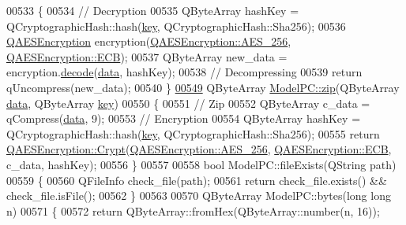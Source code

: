 \begin{DoxyCode}
00533 \{
00534     \textcolor{comment}{// Decryption}
00535     QByteArray hashKey = QCryptographicHash::hash(\mbox{\hyperlink{namespace_errors_dict_setup_a09c268098d09ffb8e5504f30fa6d5dd9}{key}}, QCryptographicHash::Sha256);
00536     \mbox{\hyperlink{class_q_a_e_s_encryption}{QAESEncryption}} encryption(\mbox{\hyperlink{class_q_a_e_s_encryption_abe48208f4f6c7d68e6a10b49b9d0b7bdacde97774ab1d4c609e04b0dd13a1e1f7}{QAESEncryption::AES\_256}}, 
      \mbox{\hyperlink{class_q_a_e_s_encryption_ad3e031c49a3d56566379d75b40b7b255a4ca7f51778e2adf1f464164a0ba8e75e}{QAESEncryption::ECB}});
00537     QByteArray new\_data = encryption.\mbox{\hyperlink{class_q_a_e_s_encryption_a58f972f2b66c2454edd5112495463bba}{decode}}(\mbox{\hyperlink{namespace_errors_dict_setup_af570460846fb9f0c91abd308a095dcdc}{data}}, hashKey);
00538     \textcolor{comment}{// Decompressing}
00539     \textcolor{keywordflow}{return} qUncompress(new\_data);
00540 \}
\mbox{\hyperlink{class_model_p_c_afebbbfa4b07deba4f68fc6dfb50f353f}{00549}} QByteArray \mbox{\hyperlink{class_model_p_c_afebbbfa4b07deba4f68fc6dfb50f353f}{ModelPC::zip}}(QByteArray \mbox{\hyperlink{namespace_errors_dict_setup_af570460846fb9f0c91abd308a095dcdc}{data}}, QByteArray \mbox{\hyperlink{namespace_errors_dict_setup_a09c268098d09ffb8e5504f30fa6d5dd9}{key}})
00550 \{
00551     \textcolor{comment}{// Zip}
00552     QByteArray c\_data = qCompress(\mbox{\hyperlink{namespace_errors_dict_setup_af570460846fb9f0c91abd308a095dcdc}{data}}, 9);
00553     \textcolor{comment}{// Encryption}
00554     QByteArray hashKey = QCryptographicHash::hash(\mbox{\hyperlink{namespace_errors_dict_setup_a09c268098d09ffb8e5504f30fa6d5dd9}{key}}, QCryptographicHash::Sha256);
00555     \textcolor{keywordflow}{return} \mbox{\hyperlink{class_q_a_e_s_encryption_a43819eeb6a7cb29fbd3cb6ad640dcbdf}{QAESEncryption::Crypt}}(\mbox{\hyperlink{class_q_a_e_s_encryption_abe48208f4f6c7d68e6a10b49b9d0b7bdacde97774ab1d4c609e04b0dd13a1e1f7}{QAESEncryption::AES\_256}}, 
      \mbox{\hyperlink{class_q_a_e_s_encryption_ad3e031c49a3d56566379d75b40b7b255a4ca7f51778e2adf1f464164a0ba8e75e}{QAESEncryption::ECB}}, c\_data, hashKey);
00556 \}
00557 
00558 \textcolor{keywordtype}{bool} ModelPC::fileExists(QString path)
00559 \{
00560     QFileInfo check\_file(path);
00561     \textcolor{keywordflow}{return} check\_file.exists() && check\_file.isFile();
00562 \}
00563 
00570 QByteArray ModelPC::bytes(\textcolor{keywordtype}{long} \textcolor{keywordtype}{long} n)
00571 \{
00572     \textcolor{keywordflow}{return} QByteArray::fromHex(QByteArray::number(n, 16));

\end{DoxyCode}
